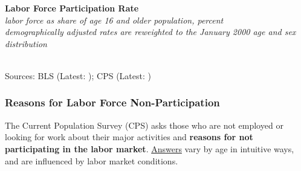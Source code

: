\documentclass{report}
\makeatletter
\newcommand{\tbllink}[1]{\href{https://raw.githubusercontent.com/bdecon/US-chartbook/master/chartbook/data/#1}{\faTable}}
\newcommand*\short[1]{\expandafter\@gobbletwo\number\numexpr#1\relax}
\newcommand{\absnode}[3]{\node[below right, align=left] at (axis cs: #1,#2) {#3};}
\newcommand{\dateaxisticks}{
		date coordinates in=x, axis line style={draw=none},
		xmax={2023-02-15},
		max space between ticks=40,	    
		xtick={{1990-01-01}, {1992-01-01}, {1994-01-01}, 
			{1996-01-01}, {1998-01-01}, {2000-01-01}, 
			{2002-01-01}, {2004-01-01}, {2006-01-01},
			{2008-01-01}, {2010-01-01}, {2012-01-01}, {2014-01-01},
		    {2016-01-01}, {2018-01-01}, {2020-01-01}, {2022-01-01}, 
		    {2024-01-01}, {2026-01-01}},
		minor xtick={{1989-01-01}, {1991-01-01}, {1993-01-01},
			{1995-01-01}, {1997-01-01}, {1999-01-01}, 
			{2001-01-01}, {2003-01-01}, {2005-01-01}, {2007-01-01},
		    {2009-01-01}, {2011-01-01}, {2013-01-01}, {2015-01-01},
		    {2017-01-01}, {2019-01-01}, {2021-01-01}, {2023-01-01}, 
		    {2025-01-01}, {2027-01-01}},
		enlarge y limits={0.06}, enlarge x limits={0.01},
		}
\newcommand{\bbar}[2]{extra #1 ticks = {{#2}}, extra #1 tick labels = ,
		extra #1 tick style = {grid=major, grid style={thick, black!25}},}
\newcommand{\stdline}[4]{\addplot[very thick, no markers, color=#1] 
		table [x=#2, y=#3, col sep=comma] {#4};	}
\newcommand{\rbars}{
		\fill[color=black!10] (axis cs:{1990-07-01},\pgfkeysvalueof{/pgfplots/ymin}) rectangle 
			(axis cs:{1991-03-01}, \pgfkeysvalueof{/pgfplots/ymax});
		\fill[color=black!10] (axis cs:{2007-12-01},\pgfkeysvalueof{/pgfplots/ymin}) rectangle 
			(axis cs:{2009-07-01}, \pgfkeysvalueof{/pgfplots/ymax});
		\fill[color=black!10] (axis cs:{2001-03-01},\pgfkeysvalueof{/pgfplots/ymin}) rectangle 
			(axis cs:{2001-11-01}, \pgfkeysvalueof{/pgfplots/ymax});
		\fill[color=black!10] (axis cs:{2020-02-01},\pgfkeysvalueof{/pgfplots/ymin}) rectangle 
			(axis cs:{2020-05-01}, \pgfkeysvalueof{/pgfplots/ymax});}
\makeatother
\begin{document}
{\begin{minipage}{0.76\textwidth}
\normalsize \textbf{Labor Force Participation Rate}\\
\footnotesize{\textit{labor force as share of age 16 and older population, percent\\demographically adjusted rates are reweighted to the January 2000 age and sex distribution}}\\
\hspace*{-2mm} \\
\footnotesize{Sources: BLS (Latest: \unskip); CPS (Latest: \unskip)} \hfill \tbllink{lfpr.csv}
\end{minipage}
\newpage
\begin{minipage}{0.76\textwidth}
\subsubsection*{Reasons for Labor Force Non-Participation}
\vspace{-0.5mm}

\small The Current Population Survey (CPS) asks those who are not employed or looking for work about their major activities and \textbf{reasons for not participating in the labor market}. \href{https://www.frbatlanta.org/chcs/human-capital-currents/2015/0612-measuring-labor-market-status-using-basic-data.aspx}{Answers} vary by age in intuitive ways, and are influenced by labor market conditions. 
\end{minipage}

}
\end{document}

